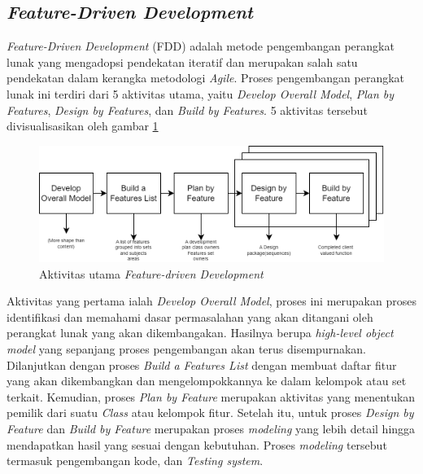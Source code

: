 \subsection{\textit{Feature-Driven Development}}
\textit{Feature-Driven Development} (FDD) adalah metode pengembangan perangkat lunak yang mengadopsi pendekatan iteratif dan merupakan salah satu pendekatan dalam kerangka metodologi \textit{Agile}.
Proses pengembangan perangkat lunak ini terdiri dari 5 aktivitas utama, yaitu \textit{Develop Overall Model}, \textit{Plan by Features}, \textit{Design by Features}, dan \textit{Build by Features}.
5 aktivitas tersebut divisualisasikan oleh gambar \ref*{Fig:FDD-langkah}
\begin{figure}[H]
	\centering
	\includegraphics[width=\textwidth]{contents/chapter-2/images/FDD.png}
	\caption[Caption]{Aktivitas utama \textit{Feature-driven Development}\cite{palmer2001practical}}
	\label{Fig:FDD-langkah}
\end{figure}
Aktivitas yang pertama ialah \textit{Develop Overall Model}, proses ini merupakan proses identifikasi dan memahami dasar permasalahan yang akan ditangani oleh perangkat lunak yang akan dikembangakan.
Hasilnya berupa \textit{high-level object model} yang sepanjang proses pengembangan akan terus disempurnakan. Dilanjutkan dengan proses \textit{Build a Features List} dengan membuat daftar fitur yang akan dikembangkan dan mengelompokkannya ke dalam kelompok atau set terkait.
Kemudian, proses \textit{Plan by Feature} merupakan aktivitas yang menentukan pemilik dari suatu \textit{Class} atau kelompok fitur.
Setelah itu, untuk proses \textit{Design by Feature} dan \textit{Build by Feature} merupakan proses \textit{modeling} yang lebih detail hingga mendapatkan hasil yang sesuai dengan kebutuhan.
Proses \textit{modeling} tersebut termasuk pengembangan kode, dan \textit{Testing system}.
